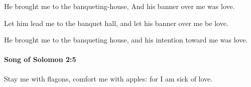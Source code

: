 			\begin{versebox}
					\item[BHS] 
					\item[LXX] 
					\item[ASV] He brought me to the banqueting-house, And his banner over me was love.
					\item[NIV] Let him lead me to the banquet hall, and let his banner over me be love.
					\item[NRSV] He brought me to the banqueting house, and his intention toward me was love.
			\end{versebox}

		\paragraph{Song of Solomon 2:5} %
			\label{SONGOFSOLOMON-2-5}

			Stay me with flagons, comfort me with apples: for I am sick of love.

